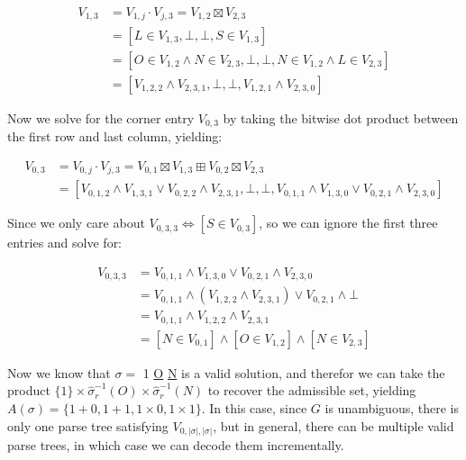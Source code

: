 \documentclass[sigplan,review,anonymous,acmsmall]{acmart}\settopmatter{printfolios=false,printccs=false,printacmref=false}
\begin{document}
  \begin{align}
    V_{1, 3} &= V_{1, j} \cdot V_{j, 3} = V_{1, 2} \boxtimes V_{2, 3}\\
    &= [L \in V_{1, 3}, \bot, \bot, S \in V_{1, 3}]\\
    &= [O \in V_{1, 2} \land N \in V_{2, 3}, \bot, \bot, N \in V_{1, 2} \land L \in V_{2, 3}]\\
    &= [V_{1, 2, 2} \land V_{2, 3, 1}, \bot, \bot, V_{1, 2, 1} \land V_{2, 3, 0}]
  \end{align}

  Now we solve for the corner entry $V_{0, 3}$ by taking the bitwise dot product between the first row and last column, yielding:

  \begin{align}
    V_{0, 3} &= V_{0, j} \cdot V_{j, 3} = V_{0, 1} \boxtimes V_{1, 3} \boxplus V_{0, 2} \boxtimes V_{2, 3}\\
    &= [V_{0, 1, 2} \land V_{1, 3, 1} \lor V_{0, 2, 2} \land V_{2, 3, 1}, \bot, \bot, V_{0, 1, 1} \land V_{1, 3, 0} \lor V_{0, 2, 1} \land V_{2, 3, 0}]
  \end{align}

  Since we only care about $V_{0, 3, 3} \Leftrightarrow [S \in V_{0, 3}]$, so we can ignore the first three entries and solve for:

  \begin{align}
    V_{0, 3, 3} &= V_{0, 1, 1} \land V_{1, 3, 0} \lor V_{0, 2, 1} \land V_{2, 3, 0}\\
    &= V_{0, 1, 1} \land (V_{1, 2, 2} \land V_{2, 3, 1}) \lor V_{0, 2, 1} \land \bot\\
    &= V_{0, 1, 1} \land V_{1, 2, 2} \land V_{2, 3, 1}\\
    &= [N \in V_{0, 1}] \land [O \in V_{1, 2}] \land [N \in V_{2, 3}]
  \end{align}

  Now we know that $\sigma =$ 1 \underline{O} \underline{N} is a valid solution, and therefor we can take the product $\{1\}\times \hat\sigma_r^{-1}(O) \times \hat\sigma_r^{-1}(N)$ to recover the admissible set, yielding $A(\sigma)=\{1+0, 1+1, 1\times 0, 1\times 1\}$. In this case, since $G$ is unambiguous, there is only one parse tree satisfying $V_{0, |\sigma|, |\sigma|}$, but in general, there can be multiple valid parse trees, in which case we can decode them incrementally.
\end{document}

